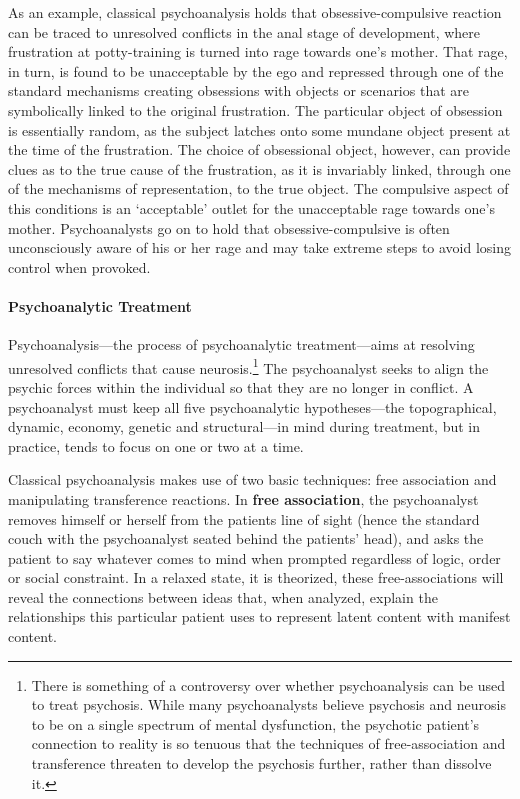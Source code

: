 \begin{refsection}
As an example, classical psychoanalysis holds that obsessive-compulsive reaction can be traced to unresolved conflicts in the anal stage of development, where frustration at potty-training is turned into rage towards one's mother. That rage, in turn, is found to be unacceptable by the ego and repressed through one of the standard mechanisms creating obsessions with objects or scenarios that are symbolically linked to the original frustration. The particular object of obsession is essentially random, as the subject latches onto some mundane object present at the time of the frustration. The choice of obsessional object, however, can provide clues as to the true cause of the frustration, as it is invariably linked, through one of the mechanisms of representation, to the true object. The compulsive aspect of this conditions is an `acceptable' outlet for the unacceptable rage towards one's mother. Psychoanalysts go on to hold that obsessive-compulsive is often unconsciously aware of his or her rage and may take extreme steps to avoid losing control when provoked. 

\paragraph{Psychoanalytic Treatment}
\label{psychoanalytictreatment}

Psychoanalysis—the process of psychoanalytic treatment—aims at resolving unresolved conflicts that cause neurosis.\footnote{There is something of a controversy over whether psychoanalysis can be used to treat psychosis. While many psychoanalysts believe psychosis and neurosis to be on a single spectrum of mental dysfunction, the psychotic patient's connection to reality is so tenuous that the techniques of free-association and transference threaten to develop the psychosis further, rather than dissolve it.} The psychoanalyst seeks to align the psychic forces within the individual so that they are no longer in conflict. A psychoanalyst must keep all five psychoanalytic hypotheses—the topographical, dynamic, economy, genetic and structural—in mind during treatment, but in practice, tends to focus on one or two at a time. 

Classical psychoanalysis makes use of two basic techniques: free association and manipulating transference reactions. In \textbf{free association}, the psychoanalyst removes himself or herself from the patients line of sight (hence the standard couch with the psychoanalyst seated behind the patients' head), and asks the patient to say whatever comes to mind when prompted regardless of logic, order or social constraint. In a relaxed state, it is theorized, these free-associations will reveal the connections between ideas that, when analyzed, explain the relationships this particular patient uses to represent latent content with manifest content.


\end{refsection}

